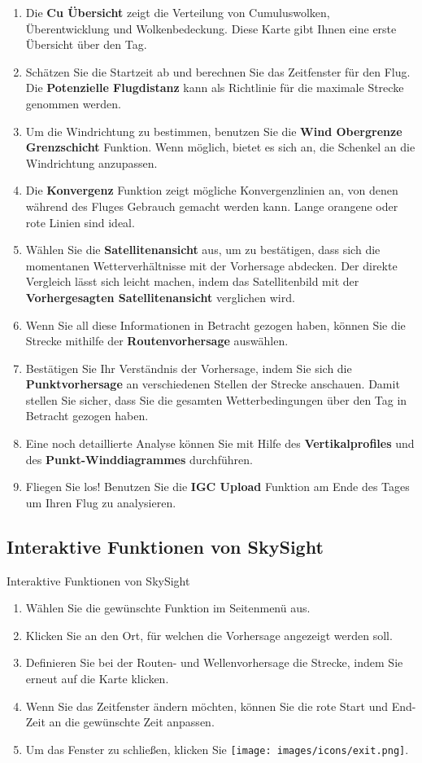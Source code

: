 \documentclass[9pt,a4paper,twocolumn]{article}
\begin{document}
\begin{enumerate}
  \item Die \textbf{Cu Übersicht} zeigt die Verteilung von Cumuluswolken, Überentwicklung und Wolkenbedeckung. Diese Karte gibt Ihnen eine erste Übersicht über den Tag. 
  \item Schätzen Sie die Startzeit ab und berechnen Sie das Zeitfenster für den Flug. Die \textbf{Potenzielle Flugdistanz} kann als Richtlinie für die maximale Strecke genommen werden. 
  \item Um die Windrichtung zu bestimmen, benutzen Sie die \textbf{Wind Obergrenze Grenzschicht} Funktion. Wenn möglich, bietet es sich an, die Schenkel an die Windrichtung anzupassen.
\item Die \textbf{Konvergenz} Funktion zeigt mögliche Konvergenzlinien an, von denen während des Fluges Gebrauch gemacht werden kann. Lange orangene oder rote Linien sind ideal.
\item Wählen Sie die \textbf{Satellitenansicht} aus, um zu bestätigen, dass sich die momentanen Wetterverhältnisse mit der Vorhersage abdecken. Der direkte Vergleich lässt sich leicht machen, indem das Satellitenbild mit der \textbf{Vorhergesagten Satellitenansicht} verglichen wird.
  \item Wenn Sie all diese Informationen in Betracht gezogen haben, können Sie die Strecke mithilfe der \textbf{Routenvorhersage} auswählen.
  \item Bestätigen Sie Ihr Verständnis der Vorhersage, indem Sie sich die \textbf{Punktvorhersage} an verschiedenen Stellen der Strecke anschauen. Damit stellen Sie sicher, dass Sie die gesamten Wetterbedingungen über den Tag in Betracht gezogen haben.
\item Eine noch detaillierte Analyse können Sie mit Hilfe des \textbf{Vertikalprofiles} und des \textbf{Punkt-Winddiagrammes} durchführen.
  \item Fliegen Sie los! Benutzen Sie die \textbf{IGC Upload} Funktion am Ende des Tages um Ihren Flug zu analysieren.
\end{enumerate}

\subsection*{Interaktive Funktionen von SkySight}
Interaktive Funktionen von SkySight
\begin{enumerate}
  \item Wählen Sie die gewünschte Funktion im Seitenmenü aus.
  \item Klicken Sie an den Ort, für welchen die Vorhersage angezeigt werden soll.
  \item Definieren Sie bei der Routen- und Wellenvorhersage die Strecke, indem Sie erneut auf die Karte klicken.
  \item Wenn Sie das Zeitfenster ändern möchten, können Sie die rote Start und End-Zeit an die gewünschte Zeit anpassen.
  \item Um das Fenster zu schließen, klicken Sie \texttt{[image: images/icons/exit.png]}.
\end{enumerate}
\end{document}

